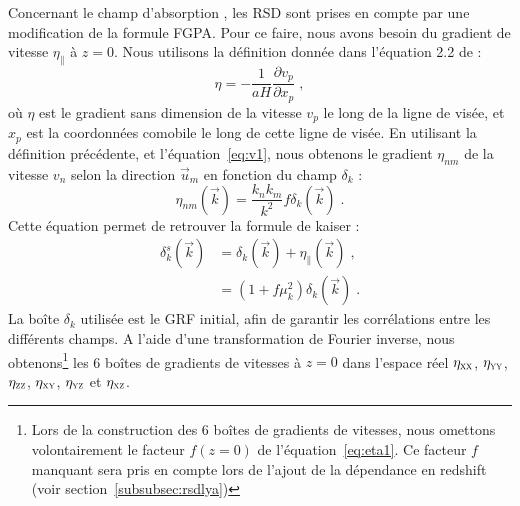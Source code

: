 
Concernant le champ d'absorption \lya{}, les RSD sont prises en compte par une modification de la formule FGPA. Pour ce faire, nous avons besoin du gradient de vitesse $\eta_{\parallel}$ à $z=0$.
Nous utilisons la définition donnée dans l'équation 2.2 de \textcite{Arinyo-i-Prats2015} :
\begin{equation}
  \eta = - \frac{1}{aH} \frac{\partial v_p}{\partial x_p} \; ,
\end{equation}
où $\eta$ est le gradient sans dimension de la vitesse $v_p$ le long de la ligne de visée, et $x_p$ est la coordonnées comobile le long de cette ligne de visée.
En utilisant la définition précédente, et l'équation~\ref{eq:v1}, nous obtenons le gradient $\eta_{nm}$ de la vitesse $v_n$ selon la direction $\vec u_m$ en fonction du champ $\delta_k$ :
\begin{equation}
  \label{eq:eta1}
  \eta_{nm}(\vec k) = \frac{k_n k_m}{k^2} f \delta_k(\vec k) \; .
\end{equation}
Cette équation permet de retrouver la formule de kaiser :
\begin{align}
  \label{eq:kaiser5}
  \delta_k^s(\vec k) &= \delta_k(\vec k) + \eta_{\parallel}(\vec k) \; ,   \\
                     &= (1 + f \mu_k^2) \delta_k(\vec k)  \; .  \nonumber
\end{align}
  La boîte $\delta_k$ utilisée est le GRF initial, afin de garantir les corrélations entre les différents champs. A l'aide d'une transformation de Fourier inverse, nous obtenons\footnote{Lors de la construction des 6 boîtes de gradients de vitesses, nous omettons volontairement le facteur $f(z=0)$ de l'équation~\ref{eq:eta1}. Ce facteur $f$ manquant sera pris en compte lors de l'ajout de la dépendance en redshift (voir section~\ref{subsubsec:rsdlya})} les 6 boîtes de gradients de vitesses  à $z = 0$ dans l'espace réel $\eta_{\textsc{xx}}$, $\eta_{\textsc{yy}}$, $\eta_{\textsc{zz}}$, $\eta_{\textsc{xy}}$, $\eta_{\textsc{yz}}$ et $\eta_{\textsc{xz}}$.
